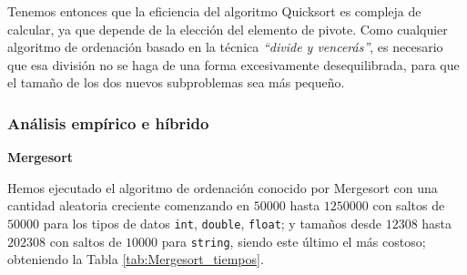 \documentclass[12pt]{article}
\begin{document}
    Tenemos entonces que la eficiencia del algoritmo Quicksort es compleja de calcular, ya que depende de la elección del elemento de pivote. Como cualquier algoritmo de ordenación basado en la técnica \emph{``divide y vencerás''}, es necesario que esa división no se haga de una forma excesivamente desequilibrada, para que el tamaño de los dos nuevos subproblemas sea más pequeño.
    
    \subsubsection{Análisis empírico e híbrido}
    \textbf{Mergesort}

    Hemos ejecutado el algoritmo de ordenación conocido por Mergesort con una cantidad aleatoria creciente comenzando en $50000$ hasta $1250000$ con saltos de $50000$ para los tipos de datos \verb|int|, \verb|double|, \verb|float|; y tamaños desde $12308$ hasta $202308$ con saltos de $10000$ para \verb|string|, siendo este último el más costoso; obteniendo la Tabla \ref{tab:Mergesort_tiempos}.
\end{document}
